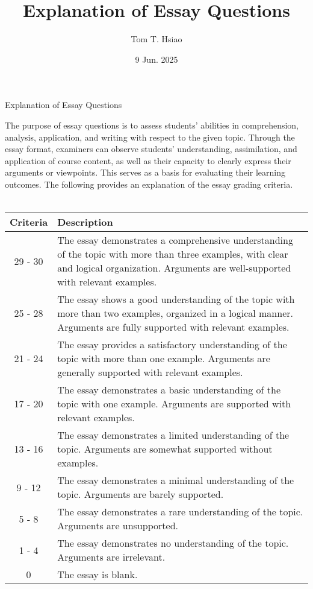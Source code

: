 \documentclass{article}
\title{Explanation of Essay Questions}
\author{Tom T. Hsiao}
\date{9 Jun. 2025}
\begin{document}
\thispagestyle{fancy}
\begin{center}
\fontsize{16pt}{16pt}\selectfont Explanation of Essay Questions
\end{center}
\fontsize{14pt}{14pt}\selectfont
The purpose of essay questions is to assess students’ abilities in comprehension, analysis, application, and writing with respect to the given topic. Through the essay format, examiners can observe students’ understanding, assimilation, and application of course content, as well as their capacity to clearly express their arguments or viewpoints. This serves as a basis for evaluating their learning outcomes. The following provides an explanation of the essay grading criteria. \\
\\ \vspace{1em} 
\begin{tabular}{|c|p{15cm}|}
\hline
Criteria & Description \\
\hline
29 - 30 & The essay demonstrates a comprehensive understanding of the topic with more than three examples, with clear and logical organization. Arguments are well-supported with relevant examples. \\
\hline
25 - 28 & The essay shows a good understanding of the topic with more than two examples, organized in a logical manner. Arguments are fully supported with relevant examples. \\
\hline
21 - 24 & The essay provides a satisfactory understanding of the topic with more than one example. Arguments are generally supported with relevant examples. \\
\hline
17 - 20 & The essay demonstrates a basic understanding of the topic with one example. Arguments are supported with relevant examples. \\
\hline
13 - 16 & The essay demonstrates a limited understanding of the topic. Arguments are somewhat supported without examples. \\
\hline
9 - 12 & The essay demonstrates a minimal understanding of the topic. Arguments are barely supported. \\
\hline
5 - 8 & The essay demonstrates a rare understanding of the topic. Arguments are unsupported. \\
\hline
1 - 4 & The essay demonstrates no understanding of the topic. Arguments are irrelevant. \\
\hline
0 & The essay is blank. \\
\hline
\end{tabular}
\end{document}
